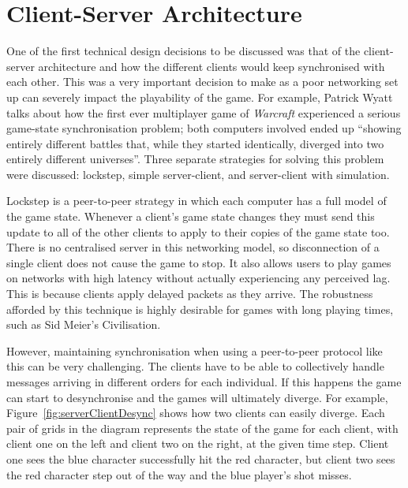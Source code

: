\section{Client-Server Architecture}

One of the first technical design decisions to be discussed was that of the client-server architecture and how the different clients would keep synchronised with each other. This was a very important decision to make as a poor networking set up can severely impact the playability of the game. For example, Patrick Wyatt talks about how the first ever multiplayer game of \emph{Warcraft} experienced a serious game-state synchronisation problem; both computers involved ended up ``showing entirely different battles that, while they started identically, diverged into two entirely different universes''.\cite{wyatt2012warcraft} Three separate strategies for solving this problem were discussed: lockstep, simple server-client, and server-client with simulation.

Lockstep is a peer-to-peer strategy in which each computer has a full model of the game state. Whenever a client's game state changes they must send this update to all of the other clients to apply to their copies of the game state too. There is no centralised server in this networking model, so disconnection of a single client does not cause the game to stop. It also allows users to play games on networks with high latency without actually experiencing any perceived lag. This is because clients apply delayed packets as they arrive. The robustness afforded by this technique is highly desirable for games with long playing times, such as Sid Meier's Civilisation.

However, maintaining synchronisation when using a peer-to-peer protocol like this can be very challenging. The clients have to be able to collectively handle messages arriving in different orders for each individual. If this happens the game can start to desynchronise and the games will ultimately diverge. For example, Figure~\ref{fig:serverClientDesync} shows how two clients can easily diverge. Each pair of grids in the diagram represents the state of the game for each client, with client one on the left and client two on the right, at the given time step. Client one sees the blue character successfully hit the red character, but client two sees the red character step out of the way and the blue player's shot misses.

